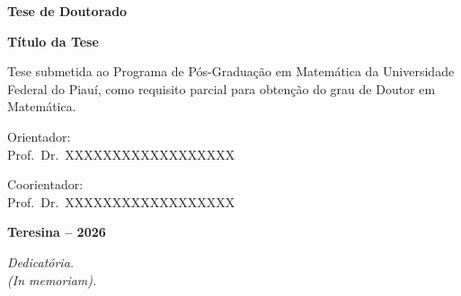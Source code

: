 \begin{titlepage}
\thispagestyle{empty}
\begin{center}

\vspace*{2cm}

{\bfseries \large Tese de Doutorado} %

\vspace{2cm}

{\bfseries \Large Título da Tese} %

\end{center}

\vspace{5cm}

\begin{flushright}
\begin{minipage}[t]{8cm}
\raggedright
Tese submetida ao Programa de Pós-Graduação em Matemática da Universidade Federal do Piauí, como requisito parcial para obtenção do grau de Doutor em Matemática. %

\vspace{1.5cm}

Orientador:\\
Prof.\ Dr.\ XXXXXXXXXXXXXXXXXX %

\vspace{0.4cm}

Coorientador:\\
Prof.\ Dr.\ XXXXXXXXXXXXXXXXXX %
\end{minipage}
\end{flushright}

\vfill

\begin{center}
{\bfseries Teresina -- 2026} %
\end{center}

\end{titlepage}

\thispagestyle{empty}
\vspace*{14cm}

\hfill
\begin{minipage}{0.55\textwidth}
\raggedleft
{\em Dedicatória.\\ %
(In memoriam).} %
\end{minipage}

